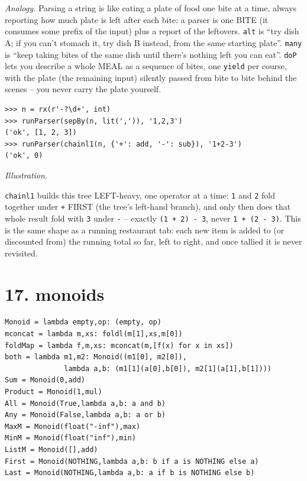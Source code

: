 \documentclass[10pt,letterpaper]{book}
\begin{document}
\textit{Analogy.} Parsing a string is like eating a plate of food one bite at a time, always
reporting how much plate is left after each bite: a parser is one BITE (it consumes some prefix of
the input) plus a report of the leftovers. \texttt{alt} is ``try dish A; if you can't stomach it, try
dish B instead, from the same starting plate''. \texttt{many} is ``keep taking bites of the same dish
until there's nothing left you can eat''. \texttt{doP} lets you describe a whole MEAL as a sequence
of bites, one \texttt{yield} per course, with the plate (the remaining input) silently passed from
bite to bite behind the scenes -- you never carry the plate yourself.
\begin{lstlisting}[style=ex]
>>> n = rx(r'-?\d+', int)
>>> runParser(sepBy(n, lit(',')), '1,2,3')
('ok', [1, 2, 3])
>>> runParser(chainl1(n, {'+': add, '-': sub}), '1+2-3')
('ok', 0)
\end{lstlisting}
\noindent\textit{Illustration.}
\begin{center}
\end{center}
\texttt{chainl1} builds this tree LEFT-heavy, one operator at a time: \texttt{1} and \texttt{2} fold
together under \texttt{+} FIRST (the tree's left-hand branch), and only then does that whole result
fold with \texttt{3} under \texttt{-} -- exactly \texttt{(1 + 2) - 3}, never \texttt{1 + (2 - 3)}.
This is the same shape as a running restaurant tab: each new item is added to (or discounted from)
the running total so far, left to right, and once tallied it is never revisited.
\section*{17. monoids}
\begin{lstlisting}[style=code]
Monoid = lambda empty,op: (empty, op)
mconcat = lambda m,xs: foldl(m[1],xs,m[0])
foldMap = lambda f,m,xs: mconcat(m,[f(x) for x in xs])
both = lambda m1,m2: Monoid((m1[0], m2[0]),
              lambda a,b: (m1[1](a[0],b[0]), m2[1](a[1],b[1])))
Sum = Monoid(0,add)
Product = Monoid(1,mul)
All = Monoid(True,lambda a,b: a and b)
Any = Monoid(False,lambda a,b: a or b)
MaxM = Monoid(float("-inf"),max)
MinM = Monoid(float("inf"),min)
ListM = Monoid([],add)
First = Monoid(NOTHING,lambda a,b: b if a is NOTHING else a)
Last = Monoid(NOTHING,lambda a,b: a if b is NOTHING else b)
\end{lstlisting}
\end{document}
